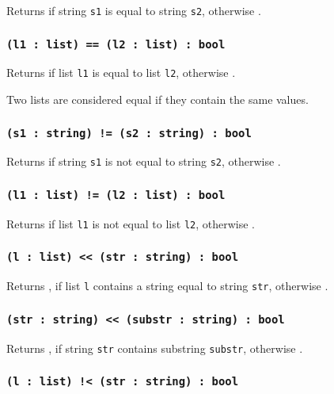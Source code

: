 Returns \true{} if string \texttt{s1} is equal to string \texttt{s2}, otherwise \false{}.

\subsubsection{\texttt{(l1 : list) == (l2 : list) : bool}}

Returns \true{} if list \texttt{l1} is equal to list \texttt{l2}, otherwise \false{}.

Two lists are considered equal if they contain the same values.

\subsubsection{\texttt{(s1 : string) != (s2 : string) : bool}}

Returns \false{} if string \texttt{s1} is not equal to string \texttt{s2}, otherwise \true{}.

\subsubsection{\texttt{(l1 : list) != (l2 : list) : bool}}

Returns \false{} if list \texttt{l1} is not equal to list \texttt{l2}, otherwise \true{}.

\subsubsection{\texttt{(l : list) << (str : string) : bool}}

Returns \true{}, if list \texttt{l} contains a string equal to string \texttt{str}, otherwise \false{}.

\subsubsection{\texttt{(str : string) << (substr : string) : bool}}

Returns \true{}, if string \texttt{str} contains substring \texttt{substr}, otherwise \false{}.

\subsubsection{\texttt{(l : list) !< (str : string) : bool}}

